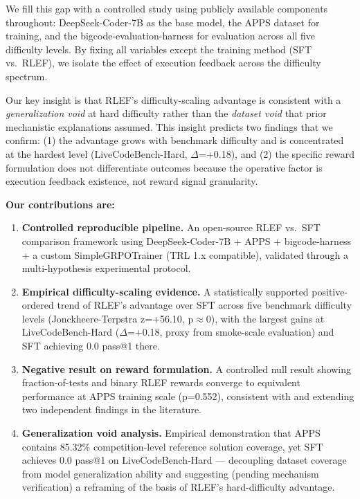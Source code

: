 We fill this gap with a controlled study using publicly available components throughout: DeepSeek-Coder-7B as the base model, the APPS dataset for training, and the bigcode-evaluation-harness for evaluation across all five difficulty levels. By fixing all variables except the training method (SFT vs.\ RLEF), we isolate the effect of execution feedback across the difficulty spectrum.

Our key insight is that RLEF's difficulty-scaling advantage is consistent with a \textit{generalization void} at hard difficulty rather than the \textit{dataset void} that prior mechanistic explanations assumed. This insight predicts two findings that we confirm: (1) the advantage grows with benchmark difficulty and is concentrated at the hardest level (LiveCodeBench-Hard, $\Delta$=+0.18), and (2) the specific reward formulation does not differentiate outcomes because the operative factor is execution feedback existence, not reward signal granularity.

\textbf{Our contributions are:}

\begin{enumerate}
  \item \textbf{Controlled reproducible pipeline.} An open-source RLEF vs.\ SFT comparison framework using DeepSeek-Coder-7B + APPS + bigcode-harness + a custom SimpleGRPOTrainer (TRL 1.x compatible), validated through a multi-hypothesis experimental protocol.

  \item \textbf{Empirical difficulty-scaling evidence.} A statistically supported positive-ordered trend of RLEF's advantage over SFT across five benchmark difficulty levels (Jonckheere-Terpstra z=+56.10, p$\approx$0), with the largest gains at LiveCodeBench-Hard ($\Delta$=+0.18, proxy from smoke-scale evaluation) and SFT achieving 0.0 pass@1 there.

  \item \textbf{Negative result on reward formulation.} A controlled null result showing fraction-of-tests and binary RLEF rewards converge to equivalent performance at APPS training scale (p=0.552), consistent with and extending two independent findings in the literature.

  \item \textbf{Generalization void analysis.} Empirical demonstration that APPS contains 85.32\% competition-level reference solution coverage, yet SFT achieves 0.0 pass@1 on LiveCodeBench-Hard --- decoupling dataset coverage from model generalization ability and suggesting (pending mechanism verification) a reframing of the basis of RLEF's hard-difficulty advantage.
\end{enumerate}
